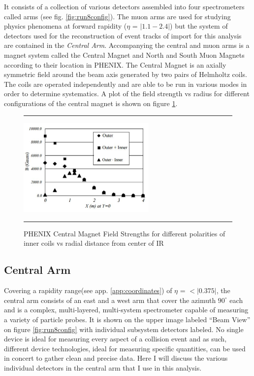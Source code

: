 It consists of a collection of various detectors assembled into four spectrometers called arms (see fig. \ref{fig:run8config}). The muon arms are used for studying physics phenomena at forward rapidity ($\eta$ = $|1.1-2.4|$)\citep{rapidityref} but the system of detectors used for the reconstruction of event tracks of import for this analysis are contained in the \textit{Central Arm}. Accompanying the central and muon arms is a magnet system called the Central Magnet and North and South Muon Magnets according to their location in PHENIX. The Central Magnet is an axially symmetric field around the beam axis generated by two pairs of Helmholtz coils. The coils are operated independently and are able to be run in various modes in order to determine systematics\citep{rolnickthesis}. A plot of the field strength vs radius for different configurations of the central magnet is shown on figure \ref{fig:centralmagnet}.

\begin{figure}[htbp]
  \centering
    \rule{35em}{0.5pt}
    \includegraphics[width=0.6\textwidth]{Figures/phenixcentralmagnet.JPG}
  \caption[PHENIX Central Magnet Field Strengths.]{PHENIX Central Magnet Field Strengths for different polarities of inner coils vs radial distance from center of IR}
  \label{fig:centralmagnet}
    \rule{35em}{0.5pt}
\end{figure}
\subsection{Central Arm}
Covering a rapidity range(see app. \ref{app:coordinates}) of $\eta$ = $<|0.375|$, the central arm consists of an east and a west arm that cover the azimuth $90^{\circ}$ each \citep{EMCfocus}and is a complex, multi-layered, multi-system spectrometer capable of measuring a variety of particle probes. It is shown on the upper image labeled ``Beam View'' on figure \ref{fig:run8config} with individual subsystem detectors labeled. No single device is ideal for measuring every aspect of a collision event and as such, different device technologies, ideal for measuring specific quantities, can be used in concert to gather clean and precise data. Here I will discuss the various individual detectors in the central arm that I use in this analysis.

